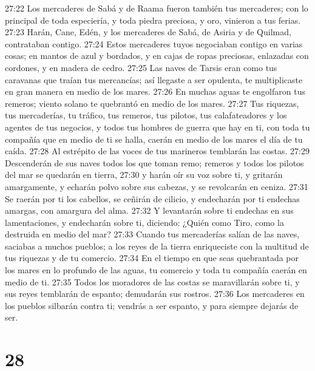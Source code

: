 27:22 Los mercaderes de Sabá y de Raama fueron también tus mercaderes; con lo principal de toda especiería, y toda piedra preciosa, y oro, vinieron a tus ferias.  
27:23 Harán, Cane, Edén, y los mercaderes de Sabá, de Asiria y de Quilmad, contrataban contigo.  
27:24 Estos mercaderes tuyos negociaban contigo en varias cosas; en mantos de azul y bordados, y en cajas de ropas preciosas, enlazadas con cordones, y en madera de cedro.  
27:25 Las naves de Tarsis eran como tus caravanas que traían tus mercancías; así llegaste a ser opulenta, te multiplicaste en gran manera en medio de los mares.  
27:26 En muchas aguas te engolfaron tus remeros; viento solano te quebrantó en medio de los mares.  
27:27 Tus riquezas, tus mercaderías, tu tráfico, tus remeros, tus pilotos, tus calafateadores y los agentes de tus negocios, y todos tus hombres de guerra que hay en ti, con toda tu compañía que en medio de ti se halla, caerán en medio de los mares el día de tu caída.  
27:28 Al estrépito de las voces de tus marineros temblarán las costas.  
27:29 Descenderán de sus naves todos los que toman remo; remeros y todos los pilotos del mar se quedarán en tierra,  
27:30 y harán oír su voz sobre ti, y gritarán amargamente, y echarán polvo sobre sus cabezas, y se revolcarán en ceniza.  
27:31 Se raerán por ti los cabellos, se ceñirán de cilicio, y endecharán por ti endechas amargas, con amargura del alma.  
27:32 Y levantarán sobre ti endechas en sus lamentaciones, y endecharán sobre ti, diciendo: ¿Quién como Tiro, como la destruida en medio del mar?  
27:33 Cuando tus mercaderías salían de las naves, saciabas a muchos pueblos; a los reyes de la tierra enriqueciste con la multitud de tus riquezas y de tu comercio.  
27:34 En el tiempo en que seas quebrantada por los mares en lo profundo de las aguas, tu comercio y toda tu compañía caerán en medio de ti.  
27:35 Todos los moradores de las costas se maravillarán sobre ti, y sus reyes temblarán de espanto; demudarán sus rostros.  
27:36 Los mercaderes en los pueblos silbarán contra ti; vendrás a ser espanto, y para siempre dejarás de ser. 

\chapter{28}

